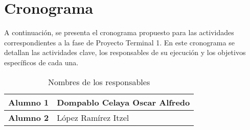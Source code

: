 \section{Cronograma}
A continuación, se presenta el cronograma propuesto para las actividades correspondientes a la fase de Proyecto Terminal 1. En este cronograma se detallan las actividades clave, los responsables de su ejecución y los objetivos específicos de cada una.
\begin{table}[H]
    \centering
    \renewcommand{\arraystretch}{1.5}
    \begin{tabular}{ |p{3cm}|p{8cm}| }
        \hline
        \textbf{Alumno 1} & Dompablo Celaya Oscar Alfredo \\\hline
        \textbf{Alumno 2} & López Ramírez Itzel \\\hline
    \end{tabular}
    \caption{Nombres de los responsables}
    \label{tab:Nombre de los responsables}
\end{table}

